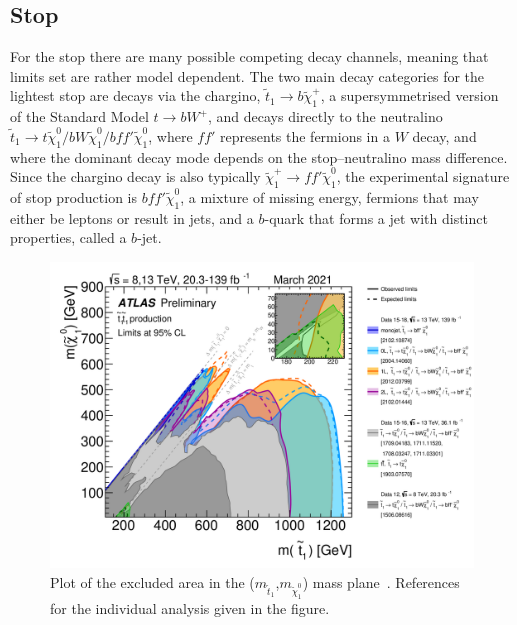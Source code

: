 \documentclass[notes.tex]{subfiles}
\begin{document}
\subsection{Stop}
For the stop there are many possible competing decay channels, meaning that limits set are rather model dependent. The two main decay categories for the lightest stop are decays via the chargino, $\tilde{t}_1\to b \tilde{\chi}^+_1$, a supersymmetrised version of the Standard Model $t\to bW^+$, and decays directly to the neutralino $\tilde{t}_1\to t\tilde{\chi}^0_1/ bW \tilde{\chi}^0_1/bff'\tilde\chi_1^0$, where $ff'$ represents the fermions in a $W$ decay, and where the dominant decay mode depends on the stop--neutralino mass difference. Since the chargino decay is also typically $\tilde{\chi}^+_1\to ff'\tilde\chi_1^0$, the experimental signature of stop production is $bff'\tilde{\chi}^0_1$, a mixture of missing energy, fermions that may either be leptons or result in jets, and a $b$-quark that forms a jet with distinct properties, called a $b$-jet.

\begin{figure}[t!]
\begin{center}
\includegraphics[width=\textwidth]{figures/stop_limit} 
\caption{Plot of the excluded area in the ($m_{\tilde{t}_1}$,$m_{\tilde{\chi}^0_1}$)  mass plane~\cite{ATL-PHYS-PUB-2021-019}. References for the individual analysis given in the figure.}
\label{fig:stoplimit}
\end{center}
\end{figure}
\end{document}
